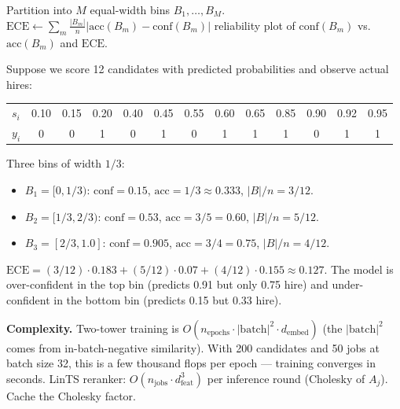 \documentclass[11pt,oneside]{scrbook}
\newcommand{\ECE}{\mathrm{ECE}}
\begin{document}
\begin{algorithm}[H]
\caption{Reliability-diagram calibration audit}\label{alg:cal}
\DontPrintSemicolon
{}
Partition into $M$ equal-width bins $B_1, \dots, B_M$.\;
$\ECE \leftarrow \sum_m \frac{|B_m|}{n} |\mathrm{acc}(B_m) - \mathrm{conf}(B_m)|$\;
\Return reliability plot of $\mathrm{conf}(B_m)$ vs.\ $\mathrm{acc}(B_m)$ and $\ECE$.\;
\end{algorithm}

\begin{example}
Suppose we score 12 candidates with predicted probabilities and observe
actual hires:
\begin{center}
\begin{tabular}{l|cccccccccccc}
\toprule
$s_i$ & 0.10 & 0.15 & 0.20 & 0.40 & 0.45 & 0.55 & 0.60 & 0.65 & 0.85 & 0.90 & 0.92 & 0.95 \\
$y_i$ & 0    & 0    & 1    & 0    & 1    & 0    & 1    & 1    & 1    & 0    & 1    & 1    \\
\bottomrule
\end{tabular}
\end{center}
Three bins of width $1/3$:
\begin{itemize}\setlength\itemsep{1pt}
  \item $B_1 = [0, 1/3)$: $\mathrm{conf} = 0.15$, $\mathrm{acc} = 1/3 \approx 0.333$, $|B|/n = 3/12$.
  \item $B_2 = [1/3, 2/3)$: $\mathrm{conf} = 0.53$, $\mathrm{acc} = 3/5 = 0.60$, $|B|/n = 5/12$.
  \item $B_3 = [2/3, 1.0]$: $\mathrm{conf} = 0.905$, $\mathrm{acc} = 3/4 = 0.75$, $|B|/n = 4/12$.
\end{itemize}
$\ECE = (3/12) \cdot 0.183 + (5/12) \cdot 0.07 + (4/12) \cdot 0.155 \approx 0.127$.
The model is over-confident in the top bin (predicts 0.91 but only 0.75 hire)
and under-confident in the bottom bin (predicts 0.15 but 0.33 hire).
\end{example}

\textbf{Complexity.} Two-tower training is $O(n_{\text{epochs}} \cdot |\mathrm{batch}|^2 \cdot d_{\text{embed}})$
(the $|\mathrm{batch}|^2$ comes from in-batch-negative similarity). With
200 candidates and 50 jobs at batch size 32, this is a few thousand
flops per epoch --- training converges in seconds. LinTS reranker:
$O(n_{\text{jobs}} \cdot d_{\text{feat}}^3)$ per inference round (Cholesky
of $A_j$). Cache the Cholesky factor.
\end{document}

